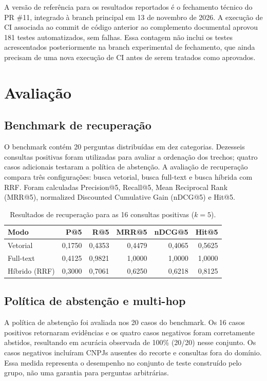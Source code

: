\documentclass[12pt]{article}
\begin{document}
A versão de referência para os resultados reportados é o fechamento técnico do PR \#11, integrado à branch principal em 13 de novembro de 2026. A execução de CI associada ao commit de código anterior ao complemento documental aprovou 181 testes automatizados, sem falhas. Essa contagem não inclui os testes acrescentados posteriormente na branch experimental de fechamento, que ainda precisam de uma nova execução de CI antes de serem tratados como aprovados.

\section{Avaliação}

\subsection{Benchmark de recuperação}

O benchmark contém 20 perguntas distribuídas em dez categorias. Dezesseis consultas positivas foram utilizadas para avaliar a ordenação dos trechos; quatro casos adicionais testaram a política de abstenção. A avaliação de recuperação compara três configurações: busca vetorial, busca full-text e busca híbrida com RRF. Foram calculadas Precision@5, Recall@5, Mean Reciprocal Rank (MRR@5), normalized Discounted Cumulative Gain (nDCG@5) e Hit@5.

\begin{table}[ht]
\centering
\caption{Resultados de recuperação para as 16 consultas positivas ($k=5$).}
\label{tab:benchmark}
\small
\begin{tabular}{lrrrrr}
\toprule
\textbf{Modo} & \textbf{P@5} & \textbf{R@5} & \textbf{MRR@5} & \textbf{nDCG@5} & \textbf{Hit@5}\\
\midrule
Vetorial & 0,1750 & 0,4353 & 0,4479 & 0,4065 & 0,5625\\
Full-text & 0,4125 & 0,9821 & 1,0000 & 1,0000 & 1,0000\\
Híbrido (RRF) & 0,3000 & 0,7061 & 0,6250 & 0,6218 & 0,8125\\
\bottomrule
\end{tabular}
\end{table}

\subsection{Política de abstenção e multi-hop}

A política de abstenção foi avaliada nos 20 casos do benchmark. Os 16 casos positivos retornaram evidências e os quatro casos negativos foram corretamente abstidos, resultando em acurácia observada de 100\% (20/20) nesse conjunto. Os casos negativos incluíram CNPJs ausentes do recorte e consultas fora do domínio. Essa medida representa o desempenho no conjunto de teste construído pelo grupo, não uma garantia para perguntas arbitrárias.
\end{document}
